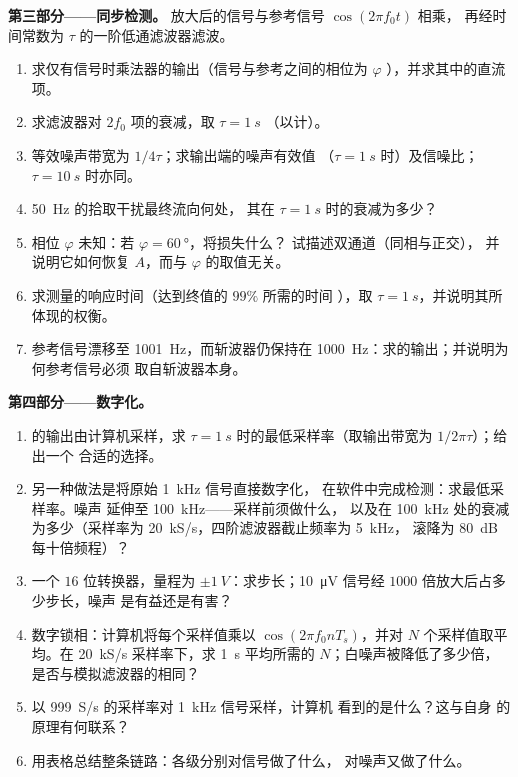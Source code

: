 \begin{problem}
\medskip
\noindent\textbf{第三部分——同步检测。}
放大后的信号与参考信号 $\cos(2\pi f_0t)$ 相乘，
再经时间常数为 $\tau$ 的一阶低通滤波器滤波。
\begin{enumerate}[resume]
  \item 求仅有信号时乘法器的输出（信号与参考之间的相位为 $\varphi$
        ），并求其中的直流项。
  \item 求滤波器对 $2f_0$ 项的衰减，取 $\tau = \qty{1}{s}$
        （以计）。
  \item 等效噪声带宽为 $1/4\tau$；求输出端的噪声有效值
        （$\tau = \qty{1}{s}$ 时）及信噪比；$\tau = \qty{10}{s}$ 时亦同。
  \item \qty{50}{Hz} 的拾取干扰最终流向何处，
        其在 $\tau = \qty{1}{s}$ 时的衰减为多少？
  \item 相位 $\varphi$ 未知：若 $\varphi = \qty{60}{\degree}$，将损失什么？
        试描述双通道（同相与正交），
        并说明它如何恢复 $A$，而与 $\varphi$ 的取值无关。
  \item 求测量的响应时间（达到终值的 $99\%$ 所需的时间
        ），取 $\tau = \qty{1}{s}$，并说明其所体现的权衡。
  \item 参考信号漂移至 \qty{1001}{Hz}，而斩波器仍保持在
        \qty{1000}{Hz}：求的输出；并说明为何参考信号必须
        取自斩波器本身。
\end{enumerate}

\medskip
\noindent\textbf{第四部分——数字化。}
\begin{enumerate}[resume]
  \item {}的输出由计算机采样，求
        $\tau = \qty{1}{s}$ 时的最低采样率（取输出带宽为 $1/2\pi\tau$）；给出一个
        合适的选择。
  \item 另一种做法是将原始 \qty{1}{kHz} 信号直接数字化，
        在软件中完成检测：求最低采样率。噪声
        延伸至 \qty{100}{kHz}——采样前须做什么，
        以及在 \qty{100}{kHz} 处的衰减为多少（采样率为
        \qty{20}{kS/s}，四阶滤波器截止频率为 \qty{5}{kHz}，
        滚降为 \qty{80}{dB} 每十倍频程）？
  \item 一个 $16$ 位转换器，量程为 $\pm\qty{1}{V}$：求步长；\qty{10}{\micro V}
        信号经 $1000$ 倍放大后占多少步长，噪声
        是有益还是有害？
  \item 数字锁相：计算机将每个采样值乘以
        $\cos(2\pi f_0nT_s)$，并对 $N$ 个采样值取平均。在 \qty{20}{kS/s}
        采样率下，求 \qty{1}{s} 平均所需的 $N$；白噪声被降低了多少倍，
        是否与模拟滤波器的相同？
  \item 以 \qty{999}{S/s} 的采样率对 \qty{1}{kHz} 信号采样，计算机
        看到的是什么？这与自身
        的原理有何联系？
  \item 用表格总结整条链路：各级分别对信号做了什么，
        对噪声又做了什么。
\end{enumerate}
\end{problem}
